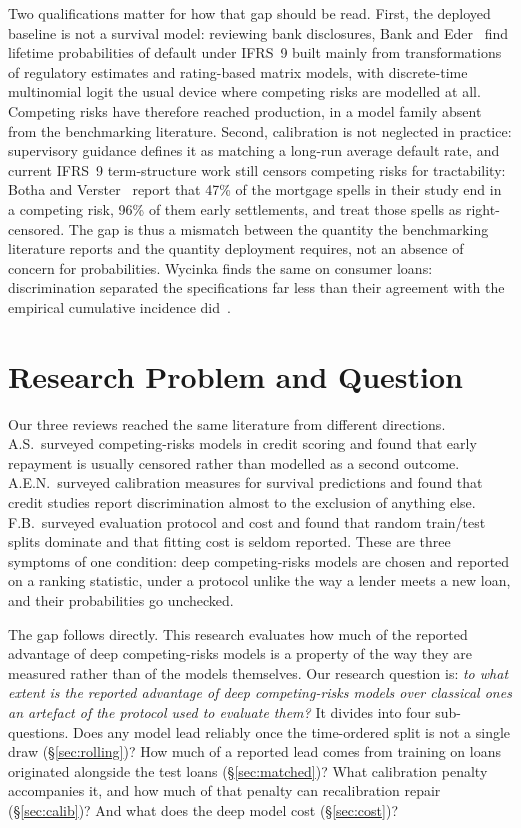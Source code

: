 \documentclass[11pt,journal]{IEEEtran}
\begin{document}
Two qualifications matter for how that gap should be read. First, the deployed baseline is not a survival model: reviewing bank
disclosures, Bank and Eder~\cite{bankeder2021review} find lifetime probabilities
of default under IFRS~9 built mainly from transformations of regulatory
estimates and rating-based matrix models, with discrete-time multinomial logit
the usual device where competing risks are modelled at all. Competing risks have
therefore reached production, in a model family absent from the benchmarking
literature. Second, calibration is not
neglected in practice: supervisory guidance defines it as matching a long-run
average default rate, and current IFRS~9 term-structure work still censors
competing risks for tractability:
Botha and Verster~\cite{bothaverster2026termstructure} report that 47\% of the
mortgage spells in their study end in a competing risk, 96\% of them early
settlements, and treat those spells as right-censored. The gap is thus a mismatch
between the quantity the benchmarking literature reports and the quantity
deployment requires, not an absence of concern for probabilities. Wycinka finds the
same on consumer loans: discrimination separated the specifications far less
than their agreement with the empirical cumulative
incidence did~\cite{wycinka2019competing}.

\section{Research Problem and Question}
Our three reviews reached the same literature from different directions.
A.S.\ surveyed competing-risks models in credit scoring and found
that early repayment is usually censored rather than modelled as a second
outcome. A.E.N.\ surveyed calibration measures for survival predictions and
found that credit studies report discrimination almost to the exclusion of
anything else. F.B.\ surveyed evaluation protocol and cost and found that random
train/test splits dominate and that fitting cost is seldom reported. These are
three symptoms of one condition: deep competing-risks models are chosen and
reported on a ranking statistic, under a protocol unlike the way a lender meets
a new loan, and their probabilities go unchecked.

The gap follows directly. This research evaluates how much of the reported
advantage of deep competing-risks models is a property of the way they are
measured rather than of the models themselves. Our research question is:
\emph{to what extent is the reported advantage of deep competing-risks models
over classical ones an artefact of the protocol used to evaluate them?} It
divides into four sub-questions. Does any model lead reliably once the
time-ordered split is not a single draw (\S\ref{sec:rolling})? How much of a
reported lead comes from training on loans originated alongside the test loans
(\S\ref{sec:matched})? What calibration penalty accompanies it, and how much of
that penalty can recalibration repair (\S\ref{sec:calib})? And what does the
deep model cost (\S\ref{sec:cost})?
\end{document}
